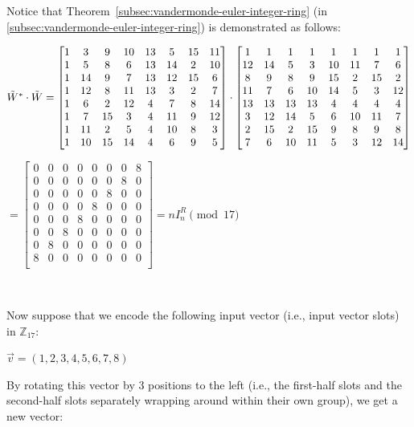 $ $

$ $

Notice that Theorem~\ref*{subsec:vandermonde-euler-integer-ring} (in \autoref{subsec:vandermonde-euler-integer-ring}) is demonstrated as follows:

$\tilde{W}^* \cdot \tilde{W} = \begin{bmatrix}
1&3&9&10&13&5&15&11\\
1&5&8&6&13&14&2&10\\
1&14&9&7&13&12&15&6\\
1&12&8&11&13&3&2&7\\
1&6&2&12&4&7&8&14\\
1&7&15&3&4&11&9&12\\
1&11&2&5&4&10&8&3\\
1&10&15&14&4&6&9&5\\
\end{bmatrix} \cdot \begin{bmatrix}
1 & 1 & 1 & 1 & 1 & 1 & 1 & 1\\
12&14&5&3&10&11&7&6\\
8&9&8&9&15&2&15&2\\
11&7&6&10&14&5&3&12\\
13&13&13&13&4&4&4&4\\
3&12&14&5&6&10&11&7\\
2&15&2&15&9&8&9&8\\
7&6&10&11&5&3&12&14\\
\end{bmatrix}$

$ = \begin{bmatrix}
0 & 0 & 0 & 0 & 0 & 0 & 0 & 8\\
0 & 0 & 0 & 0 & 0 & 0 & 8 & 0\\
0 & 0 & 0 & 0 & 0 & 8 & 0 & 0\\
0 & 0 & 0 & 0 & 8 & 0 & 0 & 0\\
0 & 0 & 0 & 8 & 0 & 0 & 0 & 0\\
0 & 0 & 8 & 0 & 0 & 0 & 0 & 0\\
0 & 8 & 0 & 0 & 0 & 0 & 0 & 0\\
8 & 0 & 0 & 0 & 0 & 0 & 0 & 0\\
\end{bmatrix} = n I_n^{R} \pmod{17}$

$ $

Now suppose that we encode the following input vector (i.e., input vector slots) in $\mathbb{Z}_{17}$:

$\vec{v} = (1, 2, 3, 4, 5, 6, 7, 8)$

By rotating this vector by 3 positions to the left (i.e., the first-half slots and the second-half slots separately wrapping around within their own group), we get a new vector:

